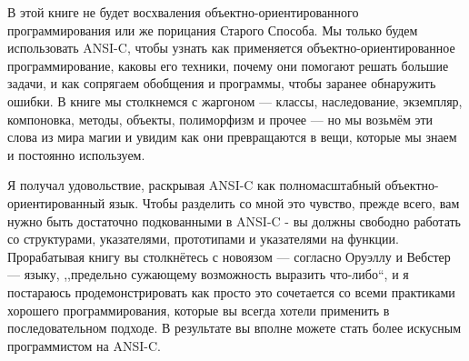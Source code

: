 \documentclass[a4paper,12pt]{book}
\begin{document}
{
\begin{comment}
This book is not going to praise object-oriented programming or condemn the
Old Way. We are simply going to use ANSI-C to discover how object-oriented programming
is done, what its techniques are, why they help us solve bigger problems,
and how we harness generality and program to catch mistakes earlier. Along
the way we encounter all the jargon — classes, inheritance, instances, linkage,
methods, objects, polymorphisms, and more — but we take it out of the realm of
magic and see how it translates into the things we have known and done all along.
\end{comment}
В этой книге не будет восхваления объектно-ориентированного программирования или же порицания 
Старого Способа. Мы только будем использовать ANSI-C, чтобы узнать как применяется объектно-ориентированное программирование, 
каковы его техники, почему они помогают решать большие задачи, 
и как сопрягаем обобщения и программы, чтобы заранее обнаружить ошибки. В 
книге мы столкнемся с жаргоном --- классы, наследование, экземпляр, компоновка, 
методы, объекты, полиморфизм и прочее --- но мы возьмём эти слова из мира 
магии и увидим как они превращаются в вещи, которые мы знаем и постоянно используем.
}

{
\begin{comment}
I had fun discovering that ANSI-C is a full-scale object-oriented language. To
share this fun you need to be reasonably fluent in ANSI-C to begin with — feeling
comfortable with structures, pointers, prototypes, and function pointers is a must.
Working through the book you will encounter all the newspeak — according to
Orwell and Webster a language ‘‘designed to diminish the range of thought’’ — and
I will try to demonstrate how it merely combines all the good programming principles
that you always wanted to employ into a coherent approach. As a result, you
may well become a more proficient ANSI-C programmer.
\end{comment}
Я получал удовольствие, раскрывая ANSI-C как полномасштабный объектно-ориентированный язык. Чтобы
разделить со мной это чувство, прежде всего, вам нужно быть достаточно подкованными в ANSI-C -
вы должны свободно работать со структурами, указателями, прототипами и указателями на функции. 
Прорабатывая книгу вы столкнётесь с новоязом --- согласно 
Оруэллу и Вебстер --- языку, ,,предельно сужающему возможность выразить что-либо``, и 
я постараюсь продемонстрировать как просто это сочетается со всеми практиками хорошего программирования,
которые вы всегда хотели применить в последовательном подходе. В результате вы
вполне можете стать более искусным программистом на ANSI-C.
}
\end{document}
